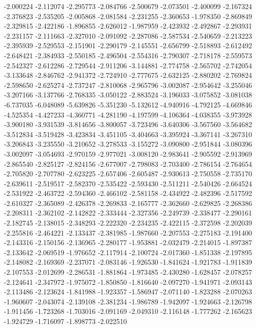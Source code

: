 -2.000224
-2.112074
-2.295773
-2.084766
-2.500679
-2.073501
-2.400099
-2.167324
-2.376823
-2.535205
-2.005868
-2.081584
-2.231255
-2.360653
-1.978350
-2.869849
-2.329815
-2.422186
-1.896855
-2.626012
-1.987959
-2.423932
-2.492867
-2.293931
-2.231157
-2.111663
-2.327010
-2.091092
-2.287086
-2.587534
-2.540659
-2.213223
-2.395939
-2.529553
-2.151901
-2.290179
-2.145551
-2.656799
-2.518893
-2.612492
-2.648421
-2.384933
-2.550185
-2.496504
-2.554316
-2.790307
-2.718178
-2.559573
-2.542327
-2.612286
-2.729544
-2.911206
-3.144881
-2.774758
-2.565702
-2.742054
-3.133648
-2.846762
-2.941372
-2.724910
-2.777675
-2.632125
-2.880202
-2.769824
-2.598650
-2.625274
-2.737247
-2.810068
-2.965796
-3.002087
-2.954642
-3.255046
-3.207166
-3.137766
-2.768335
-3.050122
-2.883524
-3.196033
-3.075852
-3.081038
-6.737035
-6.048089
-5.639826
-5.351230
-5.132612
-4.940916
-4.792125
-4.669846
-4.525354
-4.427233
-4.360771
-4.281190
-4.197599
-4.106364
-4.038355
-3.973928
-3.900180
-3.931539
-3.814656
-3.800057
-3.723496
-3.640306
-3.567560
-3.564682
-3.512834
-3.519428
-3.423834
-3.451105
-3.404663
-3.395924
-3.367141
-3.267310
-3.206843
-3.235550
-3.210652
-3.278533
-3.155272
-3.090800
-2.951844
-3.080396
-3.002097
-3.054693
-2.970159
-2.977021
-3.008120
-2.983641
-2.905592
-2.913969
-2.865540
-2.825127
-2.824156
-2.677007
-2.798083
-2.703400
-2.786154
-2.764654
-2.705820
-2.707780
-2.623225
-2.657406
-2.605487
-2.930613
-2.750558
-2.735170
-2.639611
-2.519517
-2.582370
-2.535422
-2.593430
-2.511211
-2.540426
-2.664524
-2.531922
-2.463722
-2.594360
-2.466102
-2.581158
-2.434922
-2.482396
-2.517592
-2.610327
-2.365089
-2.426378
-2.269833
-2.165777
-2.362660
-2.629825
-2.268386
-2.208311
-2.362102
-2.142822
-2.333444
-2.327356
-2.249739
-2.338477
-2.290161
-2.182745
-2.138015
-2.348293
-2.222320
-2.234235
-2.422115
-2.372598
-2.202039
-2.255816
-2.464221
-2.133437
-2.381985
-1.987660
-2.207553
-2.275183
-2.191400
-2.143316
-2.150156
-2.136965
-2.280177
-1.953881
-2.032479
-2.214015
-1.897387
-2.133642
-2.069519
-1.976652
-2.117914
-2.100724
-2.017360
-1.851338
-2.197895
-2.148082
-2.169369
-2.237071
-2.083146
-1.926530
-1.841624
-1.921783
-1.911839
-2.107553
-2.012699
-2.286531
-1.881864
-1.973485
-2.430280
-1.628457
-2.078257
-2.124641
-2.347972
-1.975072
-1.850850
-1.816640
-2.097270
-1.941971
-2.093143
-2.113486
-2.123624
-1.841988
-1.923357
-1.586947
-2.071140
-1.823288
-2.070263
-1.960607
-2.043074
-2.139108
-2.381234
-1.986789
-1.942097
-1.924663
-2.126798
-1.911456
-1.723268
-1.703016
-2.091169
-2.049310
-2.116148
-1.777262
-2.165623
-1.924729
-1.716097
-1.898773
-2.022510

